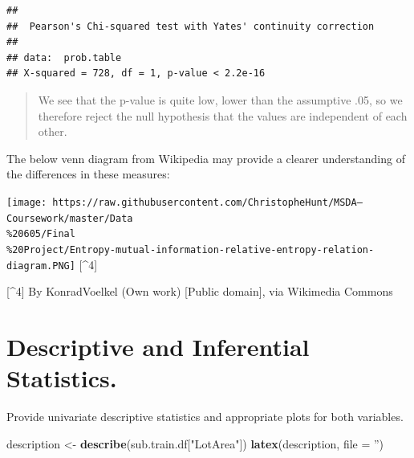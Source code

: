 \documentclass[]{article}
\newenvironment{Shaded}{\begin{snugshade}}{\end{snugshade}}
\newcommand{\KeywordTok}[1]{\textcolor[rgb]{0.13,0.29,0.53}{\textbf{{#1}}}}
\newcommand{\DataTypeTok}[1]{\textcolor[rgb]{0.13,0.29,0.53}{{#1}}}
\newcommand{\StringTok}[1]{\textcolor[rgb]{0.31,0.60,0.02}{{#1}}}
\newcommand{\NormalTok}[1]{{#1}}
\begin{document}
\begin{Shaded}
\end{Shaded}

\begin{verbatim}
## 
##  Pearson's Chi-squared test with Yates' continuity correction
## 
## data:  prob.table
## X-squared = 728, df = 1, p-value < 2.2e-16
\end{verbatim}

\begin{quote}
We see that the p-value is quite low, lower than the assumptive .05, so
we therefore reject the null hypothesis that the values are independent
of each other.
\end{quote}

The below venn diagram from Wikipedia may provide a clearer
understanding of the differences in these measures:

\texttt{[image: https://raw.githubusercontent.com/ChristopheHunt/MSDA---Coursework/master/Data\\\%20605/Final\\\%20Project/Entropy-mutual-information-relative-entropy-relation-diagram.PNG]}
{[}\^{}4{]}

{[}\^{}4{]} By KonradVoelkel (Own work) {[}Public domain{]}, via
Wikimedia Commons

\section{Descriptive and Inferential
Statistics.}\label{descriptive-and-inferential-statistics.}

Provide univariate descriptive statistics and appropriate plots for both
variables.

\begin{Shaded}
\begin{Highlighting}[]
\NormalTok{description <-}\StringTok{ }\KeywordTok{describe}\NormalTok{(sub.train.df[}\StringTok{"LotArea"}\NormalTok{])}
\KeywordTok{latex}\NormalTok{(description, }\DataTypeTok{file =} \StringTok{''}\NormalTok{)}
\end{Highlighting}
\end{Shaded}
\end{document}
